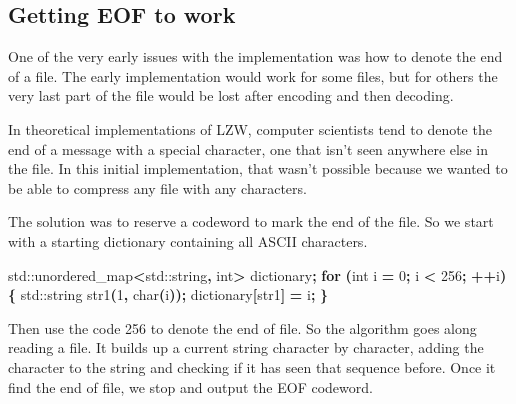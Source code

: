 \documentclass[12pt,twoside]{reedthesis}
\newenvironment{Shaded}{\begin{snugshade}}{\end{snugshade}}
\newcommand{\BuiltInTok}[1]{#1}
\newcommand{\ControlFlowTok}[1]{\textcolor[rgb]{0.13,0.29,0.53}{\textbf{#1}}}
\newcommand{\DataTypeTok}[1]{\textcolor[rgb]{0.13,0.29,0.53}{#1}}
\newcommand{\DecValTok}[1]{\textcolor[rgb]{0.00,0.00,0.81}{#1}}
\newcommand{\NormalTok}[1]{#1}
\newcommand{\OperatorTok}[1]{\textcolor[rgb]{0.81,0.36,0.00}{\textbf{#1}}}
\begin{document}
\hypertarget{getting-eof-to-work}{%
\subsection{Getting EOF to work}\label{getting-eof-to-work}}

One of the very early issues with the implementation was how to denote the end of a file. The early implementation would work for some files, but for others the very last part of the file would be lost after encoding and then decoding.

In theoretical implementations of LZW, computer scientists tend to denote the end of a message with a special character, one that isn't seen anywhere else in the file. In this initial implementation, that wasn't possible because we wanted to be able to compress any file with any characters.

The solution was to reserve a codeword to mark the end of the file. So we start with a starting dictionary containing all ASCII characters.
\begin{Shaded}
\begin{Highlighting}[]
    \BuiltInTok{std::}\NormalTok{unordered\_map}\OperatorTok{\textless{}}\BuiltInTok{std::}\NormalTok{string}\OperatorTok{,} \DataTypeTok{int}\OperatorTok{\textgreater{}}\NormalTok{ dictionary}\OperatorTok{;}
    \ControlFlowTok{for} \OperatorTok{(}\DataTypeTok{int}\NormalTok{ i }\OperatorTok{=} \DecValTok{0}\OperatorTok{;}\NormalTok{ i }\OperatorTok{\textless{}} \DecValTok{256}\OperatorTok{;} \OperatorTok{++}\NormalTok{i}\OperatorTok{)\{}
        \BuiltInTok{std::}\NormalTok{string}\OperatorTok{ }\NormalTok{str1}\OperatorTok{(}\DecValTok{1}\OperatorTok{,} \DataTypeTok{char}\OperatorTok{(}\NormalTok{i}\OperatorTok{));}
\NormalTok{        dictionary}\OperatorTok{[}\NormalTok{str1}\OperatorTok{]} \OperatorTok{=}\NormalTok{ i}\OperatorTok{;}
    \OperatorTok{\}}
\end{Highlighting}
\end{Shaded}
Then use the code 256 to denote the end of file. So the algorithm goes along reading a file. It builds up a current string character by character, adding the character to the string and checking if it has seen that sequence before. Once it find the end of file, we stop and output the EOF codeword.
\end{document}
